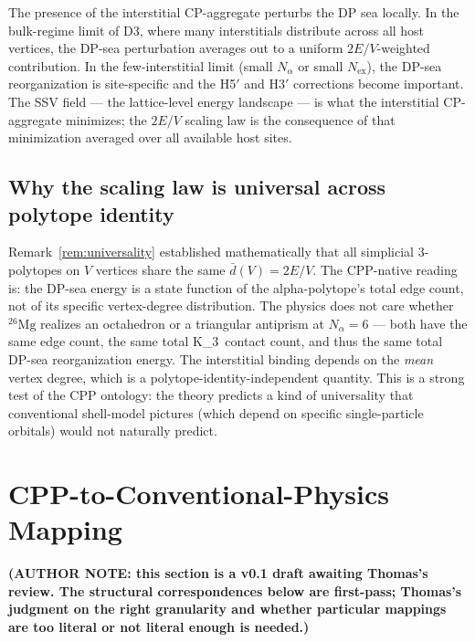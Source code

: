 \documentclass[11pt,letterpaper]{article}
\theoremstyle{definition}
\newcommand{\Nalpha}{N_\alpha}
\newcommand{\Nex}{N_{\text{ex}}}
\newcommand{\Kthree}{K_3}
\begin{document}
The presence of the interstitial CP-aggregate perturbs the DP sea locally. In the bulk-regime limit of D3, where many interstitials distribute across all host vertices, the DP-sea perturbation averages out to a uniform $2E/V$-weighted contribution. In the few-interstitial limit (small $\Nalpha$ or small $\Nex$), the DP-sea reorganization is site-specific and the H5$'$ and H3$'$ corrections become important. The SSV field --- the lattice-level energy landscape --- is what the interstitial CP-aggregate minimizes; the $2E/V$ scaling law is the consequence of that minimization averaged over all available host sites.

\subsection{Why the scaling law is universal across polytope identity}
\label{sec:universality-cpp}

Remark~\ref{rem:universality} established mathematically that all simplicial 3-polytopes on $V$ vertices share the same $\bar{d}(V) = 2E/V$. The CPP-native reading is: the DP-sea energy is a state function of the alpha-polytope's total edge count, not of its specific vertex-degree distribution. The physics does not care whether ${}^{26}\mathrm{Mg}$ realizes an octahedron or a triangular antiprism at $\Nalpha = 6$ --- both have the same edge count, the same total \Kthree\ contact count, and thus the same total DP-sea reorganization energy. The interstitial binding depends on the \emph{mean} vertex degree, which is a polytope-identity-independent quantity. This is a strong test of the CPP ontology: the theory predicts a kind of universality that conventional shell-model pictures (which depend on specific single-particle orbitals) would not naturally predict.


\section{CPP-to-Conventional-Physics Mapping}
\label{sec:mapping}

\textbf{(AUTHOR NOTE: this section is a v0.1 draft awaiting Thomas's review. The structural correspondences below are first-pass; Thomas's judgment on the right granularity and whether particular mappings are too literal or not literal enough is needed.)}
\end{document}
